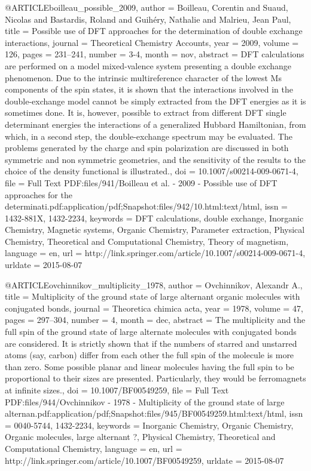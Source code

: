 @ARTICLE{boilleau_possible_2009,
  author = {Boilleau, Corentin and Suaud, Nicolas and Bastardis, Roland and Guih{\'e}ry,
	Nathalie and Malrieu, Jean Paul},
  title = {Possible use of {DFT} approaches for the determination of double
	exchange interactions},
  journal = {Theoretical Chemistry Accounts},
  year = {2009},
  volume = {126},
  pages = {231--241},
  number = {3-4},
  month = nov,
  abstract = {DFT calculations are performed on a model mixed-valence system presenting
	a double exchange phenomenon. Due to the intrinsic multireference
	character of the lowest Ms components of the spin states, it is shown
	that the interactions involved in the double-exchange model cannot
	be simply extracted from the DFT energies as it is sometimes done.
	It is, however, possible to extract from different DFT single determinant
	energies the interactions of a generalized Hubbard Hamiltonian, from
	which, in a second step, the double-exchange spectrum may be evaluated.
	The problems generated by the charge and spin polarization are discussed
	in both symmetric and non symmetric geometries, and the sensitivity
	of the results to the choice of the density functional is illustrated.},
  doi = {10.1007/s00214-009-0671-4},
  file = {Full Text PDF:files/941/Boilleau et al. - 2009 - Possible use of DFT approaches for the         determinati.pdf:application/pdf;Snapshot:files/942/10.html:text/html},
  issn = {1432-881X, 1432-2234},
  keywords = {DFT calculations, double exchange, Inorganic Chemistry, Magnetic systems,
	Organic Chemistry, Parameter extraction, Physical Chemistry, Theoretical
	and Computational Chemistry, Theory of magnetism},
  language = {en},
  url = {http://link.springer.com/article/10.1007/s00214-009-0671-4},
  urldate = {2015-08-07}
}

@ARTICLE{ovchinnikov_multiplicity_1978,
  author = {Ovchinnikov, Alexandr A.},
  title = {Multiplicity of the ground state of large alternant organic molecules
	with conjugated bonds},
  journal = {Theoretica chimica acta},
  year = {1978},
  volume = {47},
  pages = {297--304},
  number = {4},
  month = dec,
  abstract = {The multiplicity and the full spin of the ground state of large alternate
	molecules with conjugated bonds are considered. It is strictly shown
	that if the numbers of starred and unstarred atoms (say, carbon)
	differ from each other the full spin of the molecule is more than
	zero. Some possible planar and linear molecules having the full spin
	to be proportional to their sizes are presented. Particularly, they
	would be ferromagnets at infinite sizes.},
  doi = {10.1007/BF00549259},
  file = {Full Text PDF:files/944/Ovchinnikov - 1978 - Multiplicity of the ground state of large alternan.pdf:application/pdf;Snapshot:files/945/BF00549259.html:text/html},
  issn = {0040-5744, 1432-2234},
  keywords = {Inorganic Chemistry, Organic Chemistry, Organic molecules, large alternant
	?, Physical Chemistry, Theoretical and Computational Chemistry},
  language = {en},
  url = {http://link.springer.com/article/10.1007/BF00549259},
  urldate = {2015-08-07}
}

